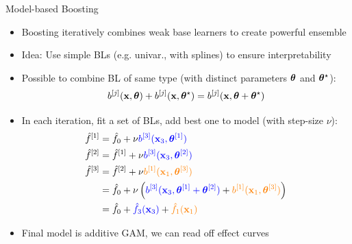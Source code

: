 \documentclass[10pt,compress,t,notes=noshow, xcolor=table]{beamer}
\begin{document}

\begin{frame}{Model-based Boosting %
}

\begin{itemize}%
\item Boosting iteratively combines weak base learners to create powerful ensemble 
\item
Idea: Use simple BLs (e.g. univar., with splines) to ensure interpretability
\item
Possible to combine BL of same type (with distinct parameters $\bm{\theta}$ and $\bm{\theta}^{\star}$):
$$b^{[j]}(\mathbf{x}, \bm{\theta}) + b^{[j]}(\mathbf{x}, \bm{\theta}^{\star}) = b^{[j]}(\mathbf{x}, \bm{\theta} + \bm{\theta}^{\star}) $$
\pause
\item %
In each iteration, fit a set of BLs, add best one to model (with step-size $\nu$):
\begin{align*}
\hat{f}^{[1]} &= \hat{f}_0 + \nu \textcolor{blue}{b^{[3]}(\mathbf{x}_3, \bm{\theta}^{[1]})} \\
\hat{f}^{[2]} &= \hat{f}^{[1]} + \nu \textcolor{blue}{b^{[3]}(\mathbf{x}_3, \bm{\theta}^{[2]})} \\
\hat{f}^{[3]} &= \hat{f}^{[2]} + \nu \textcolor{orange}{b^{[1]}(\mathbf{x}_1, \bm{\theta}^{[3]})} \\
&= \hat{f}_0 + \nu \left(\textcolor{blue}{b^{[3]}(\mathbf{x}_3, \bm{\theta}^{[1]} + \bm{\theta}^{[2]})} + \textcolor{orange}{b^{[1]}(\mathbf{x}_1, \bm{\theta}^{[3]})}\right) 
\\
&= \hat{f}_0 + \textcolor{blue}{\hat{f}_3(\mathbf{x}_3)} + \textcolor{orange}{\hat{f}_1(\mathbf{x}_1)}
\end{align*}
\item Final model is additive GAM, we can read off effect curves
\end{itemize}
\end{frame}
\end{document}
